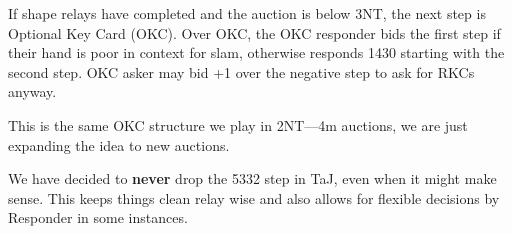 \documentclass[main]{subfile}
\begin{document}
	If shape relays have completed and the auction is below 3NT, the next step is Optional Key Card (OKC).  Over OKC, the OKC responder bids the first step if their hand is poor in context for slam, otherwise responds 1430 starting with the second step. 	OKC asker may bid +1 over the negative step to ask for RKCs anyway.   
	
	This is the same OKC structure we play in 2NT----4m auctions, we are just expanding the idea to new auctions.
	
	We have decided to \textbf{never} drop the 5332 step in TaJ, even when it might make sense.  This keeps things clean relay wise and also allows for flexible decisions by Responder in some instances.
	
\end{document}
